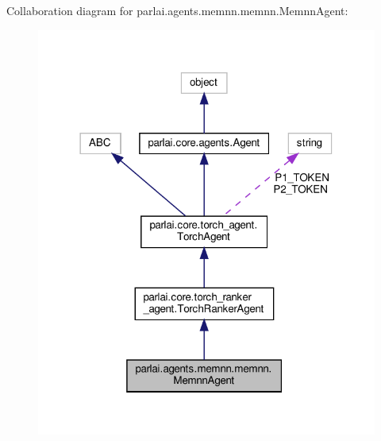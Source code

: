 Collaboration diagram for parlai.\+agents.\+memnn.\+memnn.\+Memnn\+Agent\+:
\nopagebreak
\begin{figure}[H]
\begin{center}
\leavevmode
\includegraphics[width=318pt]{classparlai_1_1agents_1_1memnn_1_1memnn_1_1MemnnAgent__coll__graph}
\end{center}
\end{figure}
